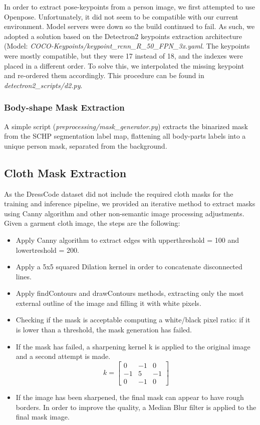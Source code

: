In order to extract pose-keypoints from a person image, we first attempted to use Openpose. Unfortunately, it did not seem to be compatible with our current environment. Model servers were down so the build continued to fail. As such, we adopted a solution based on the Detectron2 \cite{detectron2} keypoints extraction architecture (Model: \textit{COCO-Keypoints/keypoint\_rcnn\_R\_50\_FPN\_3x.yaml}. The keypoints were mostly compatible, but they were 17 instead of 18, and the indexes were placed in a different order. To solve this, we interpolated the missing keypoint and re-ordered them accordingly. This procedure can be found in \textit{detectron2\_scripts/d2.py}.


\subsubsection{Body-shape Mask Extraction}
 A simple script (\textit{preprocessing/mask\_generator.py}) extracts the binarized mask from the SCHP segmentation label map, flattening all body-parts labels into a unique person mask, separated from the background. 


\subsection{Cloth Mask Extraction}
As the DressCode dataset did not include the required cloth masks for the training and inference pipeline, we provided an iterative method to extract masks using Canny algorithm and other non-semantic image processing adjustments. Given a garment cloth image, the steps are the following:

\begin{itemize}
	\item Apply Canny algorithm to extract edges with upperthreshold = 100 and lowertreshold = 200.
	\item Apply a 5x5 squared Dilation kernel in order to concatenate disconnected lines.
	\item Apply findContours and drawContours methods, extracting only the most external outline of the image and filling it with white pixels.
	\item Checking if the mask is acceptable computing a white/black pixel ratio: if it is lower than a threshold, the mask generation has failed.
	\item If the mask has failed, a sharpening kernel k is applied to the original image and a second attempt is made.
\[
k=\begin{bmatrix}
		    0     & -1 & 0 \\
		    -1    & 5 & -1 \\
		    0     & -1  & 0 
		\end{bmatrix}
\]
	\item If the image has been sharpened, the final mask can appear to have rough borders. In order to improve the quality, a Median Blur filter is applied to the final mask image.
		
\end{itemize}

